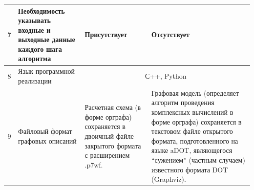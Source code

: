 \begin{landscape}
\begin{longtable}{|c|p{}|p{}|p{}|}
    \hline
    7          & Необходимость указывать входные и выходные данные каждого шага алгоритма                   & Присутствует                                                                                                                                                                                                                                                                                                                                                                                                                                                                                                                                                                                                                                    & Отсутствует                                                                                                                                                                                                                                                                       \\
    \hline
    8          & Язык программной реализации                                                                & \multicolumn{2}{c|}{С++, Python}                                                                                                                                                                                                                                                                                                                                                                                                                                                                                                                                                                                                                                                                                                                                                                                                                                                                                                    \\
    \hline
    9          & Файловый формат графовых описаний                                                          & Расчетная схема (в форме орграфа) сохраняется в двоичный файле закрытого формата с расширением \textsf{.p7wf}.                                                                                                                                                                                                                                                                                                                                                                                                                                                                                                                                  & Графовая модель (определяет алгоритм проведения комплексных вычислений в форме орграфа) сохраняется в текстовом файле открытого формата, подготовленного на языке \gls{aDOT}\cite{SokolovADOT2020}, являющегося ``сужением'' (частным случаем) известного формата DOT (Graphviz). \\

\end{longtable}
\end{landscape}
